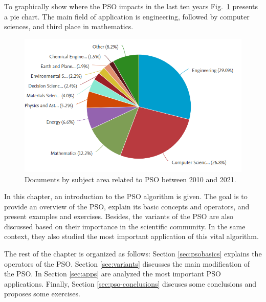 To graphically show where the PSO impacts in the last ten years Fig.~\ref{fig:PSOarea}  presents a pie chart. The main field of application is engineering, followed by computer sciences, and third place in mathematics.

\begin{figure}[h!]
  \centering
  \includegraphics[scale=0.5]{"Part 2 - Search-Based Optimization/Particle Swarm Optimization/Images/PSO Area.PNG"}
  \caption{Documents by subject area related to PSO between 2010 and 2021. \label{fig:PSOarea}}
\end{figure}

In this chapter, an introduction to the PSO algorithm is given. The goal is to provide an overview of the PSO, explain its basic concepts and operators, and present examples and exercises. Besides, the variants of the PSO are also discussed based on their importance in the scientific community. In the same context, they also studied the most important application of this vital algorithm.

The rest of the chapter is organized as follows: Section \ref{sec:psobasics} explains the operators of the PSO. Section \ref{sec:variants} discusses the main modification of the PSO. In Section \ref{sec:apps} are analyzed the most important PSO applications. Finally, Section \ref{sec:pso-conclusions} discuses some conclusions and proposes some exercises.



